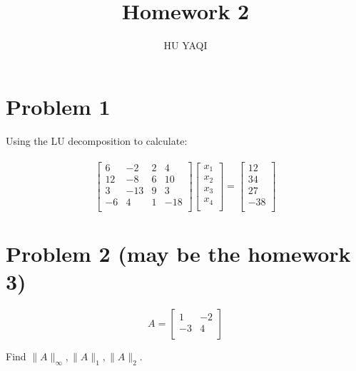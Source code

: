 \documentclass{article}
\title{ Homework 2 }
\author{HU YAQI}
\begin{document}
\maketitle
\setlength{\parindent}{0pt}

\section{ Problem 1 }
Using the LU decomposition to calculate:\\
\\
$$
\begin{bmatrix}
6 & -2 & 2 & 4\\
12 & -8 & 6 & 10\\
3 & -13 & 9 & 3\\
-6 & 4 & 1 & -18\\
\end{bmatrix}
\begin{bmatrix}
x_1 \\ 
x_2 \\
x_3 \\
x_4 \\
\end{bmatrix}
=
\begin{bmatrix}
12 \\ 
34 \\
27 \\
-38 \\
\end{bmatrix}
$$

\section{ Problem 2 (may be the homework 3) }
$$
A=\begin{bmatrix}
1 & -2 \\ 
-3 & 4 \\
\end{bmatrix}
$$

Find $\| A \|_\infty, \| A \|_1, \| A \|_2.$
\end{document}
